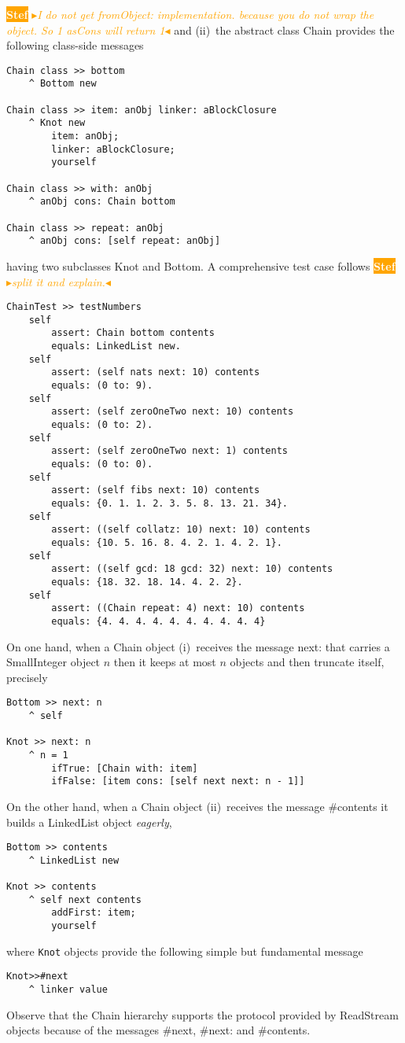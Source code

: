 \documentclass[a4paper,11pt]{article}
\newcommand{\nb}[3]{
		{\colorbox{#2}{\bfseries\sffamily\scriptsize\textcolor{white}{#1}}}
		{\textcolor{#2}{\sf\small$\blacktriangleright$\textit{#3}$\blacktriangleleft$}}}
\newcommand{\nb}[3]{}
\newcommand{\sd}[1]{\nb{Stef}{orange}{#1}}
\newcommand{\ct}[1]{{\textsf{#1}}\xspace}
\begin{document}
\sd{I do not get fromObject: implementation. because you do not wrap the object.
So 1 asCons will return 1}
and (ii)~the abstract class \ct{Chain} provides the following class-side messages
\begin{verbatim}
Chain class >> bottom
    ^ Bottom new

Chain class >> item: anObj linker: aBlockClosure
    ^ Knot new
        item: anObj;
        linker: aBlockClosure;
        yourself

Chain class >> with: anObj
    ^ anObj cons: Chain bottom

Chain class >> repeat: anObj
    ^ anObj cons: [self repeat: anObj]
\end{verbatim}
having two subclasses \ct{Knot} and \ct{Bottom}. A comprehensive
test case follows \sd{split it and explain.}
\begin{verbatim}
ChainTest >> testNumbers
    self
        assert: Chain bottom contents
        equals: LinkedList new.
    self
        assert: (self nats next: 10) contents
        equals: (0 to: 9).
    self
        assert: (self zeroOneTwo next: 10) contents
        equals: (0 to: 2).
    self
        assert: (self zeroOneTwo next: 1) contents
        equals: (0 to: 0).
    self
        assert: (self fibs next: 10) contents
        equals: {0. 1. 1. 2. 3. 5. 8. 13. 21. 34}.
    self
        assert: ((self collatz: 10) next: 10) contents
        equals: {10. 5. 16. 8. 4. 2. 1. 4. 2. 1}.
    self
        assert: ((self gcd: 18 gcd: 32) next: 10) contents
        equals: {18. 32. 18. 14. 4. 2. 2}.
    self
        assert: ((Chain repeat: 4) next: 10) contents
        equals: {4. 4. 4. 4. 4. 4. 4. 4. 4. 4}
\end{verbatim}

On one hand, when a \ct{Chain} object (i)~receives the message
\ct{next:} that carries a \ct{SmallInteger} object $n$ then it keeps at most
$n$ objects and then truncate itself, precisely
\begin{verbatim}
Bottom >> next: n
    ^ self

Knot >> next: n
    ^ n = 1
        ifTrue: [Chain with: item]
        ifFalse: [item cons: [self next next: n - 1]]
\end{verbatim}

On the other hand, when a \ct{Chain} object (ii)~receives the message
\ct{\#contents} it builds a \ct{LinkedList} object \textit{eagerly},
\begin{verbatim}
Bottom >> contents
    ^ LinkedList new

Knot >> contents
    ^ self next contents
        addFirst: item;
        yourself
\end{verbatim}
where \Verb|Knot| objects provide the following simple but fundamental message
\begin{verbatim}
Knot>>#next
    ^ linker value
\end{verbatim}
Observe that the \ct{Chain} hierarchy supports the protocol provided
by \ct{ReadStream} objects because of the messages \ct{\#next}, \ct{\#next:}
and \ct{\#contents}.
\end{document}
